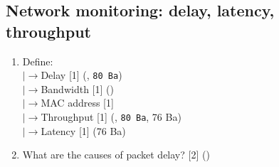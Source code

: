 \documentclass[12pt]{article}
\newcommand{\lb}{\\$\left|\rightarrow\right.$}
\begin{document}
	\subsection{Network monitoring: delay, latency, throughput}
		\begin{enumerate}[noitemsep, topsep=0pt]	
			\item Define:
			\lb Delay \hfill [1] (, \texttt{80 Ba})
			\lb Bandwidth \hfill [1] ()
			\lb MAC address \hfill [1] 
			\lb Throughput \hfill [1] (, \texttt{80 Ba}, 76 Ba)
			\lb Latency \hfill [1] (76 Ba)
			
			\item What are the causes of packet delay? \hfill [2] ()
		\end{enumerate}
\end{document}
